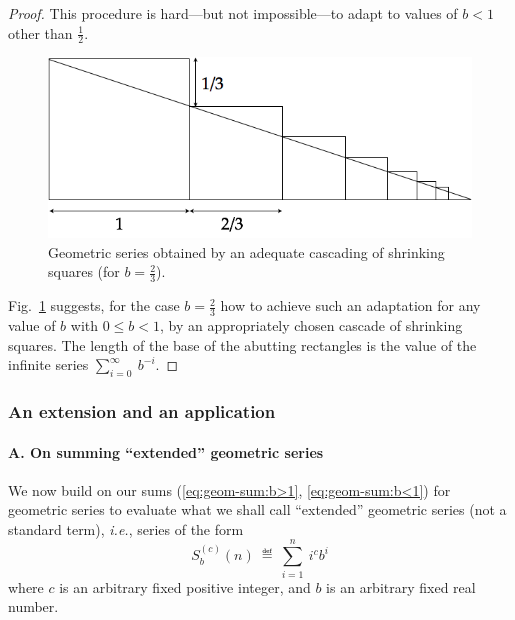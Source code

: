 \begin{proof}
This procedure is hard---but not impossible---to adapt to values of $b
<1$ other than $\frac{1}{2}$.
\begin{figure}[h]
\begin{center}
       \includegraphics[scale=0.4]{FiguresMaths/SumGeometric2tiers}
\caption{Geometric series obtained by an adequate cascading of
  shrinking squares (for $b = \frac{2}{3}$).}
       \label{fig:sumGeoGeneral}
\end{center}
\end{figure}
Fig.~\ref{fig:sumGeoGeneral} suggests, for the case $b = \frac{2}{3}$
how to achieve such an adaptation for any value of $b$ with $0 \leq b
<1$, by an appropriately chosen cascade of shrinking squares.  The
length of the base of the abutting rectangles is the value of the
infinite series $\displaystyle \sum_{i=0}^\infty \ b^{-i}$.
\end{proof}

\subsubsection{An extension and an application}

\paragraph{A. On summing ``extended'' geometric series}

We now build on our sums (\ref{eq:geom-sum:b>1},
\ref{eq:geom-sum:b<1}) for geometric series to evaluate what we shall
call ``extended'' geometric series (not a standard term), \textit{i.e.}, series
of the form
\[ S_b^{(c)}(n) \ \eqdef \ \sum_{i=1}^n \ i^c b^i \]
where $c$ is an arbitrary fixed positive integer, and $b$ is an
arbitrary fixed real number.

